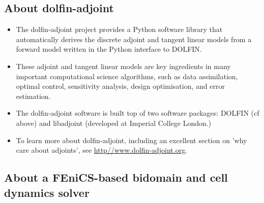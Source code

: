 \documentclass[a4paper, reqno]{amsart}
\numberwithin{equation}{section}
\begin{document}
\subsection{About dolfin-adjoint}

\begin{itemize}
\item
  The dolfin-adjoint project provides a Python software library that
  automatically derives the discrete adjoint and tangent linear models
  from a forward model written in the Python interface to DOLFIN.
\item These adjoint and tangent linear models are key ingredients in
  many important computational science algorithms, such as data
  assimilation, optimal control, sensitivity analysis, design
  optimisation, and error estimation.
\item
  The dolfin-adjoint software is built top of two software packages:
  DOLFIN (cf above) and libadjoint (developed at Imperial College
  London.)
\item
  To learn more about dolfin-adjoint, including an excellent section
  on 'why care about adjoints', see
  \url{http//www.dolfin-adjoint.org}.
\end{itemize}

\subsection{About a FEniCS-based bidomain and cell dynamics solver}
\end{document}
